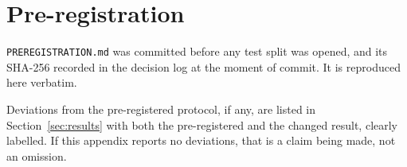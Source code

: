 \section{Pre-registration}
\label{app:prereg}

\texttt{PREREGISTRATION.md} was committed before any test split was opened, and its SHA-256 recorded
in the decision log at the moment of commit. It is reproduced here verbatim.


Deviations from the pre-registered protocol, if any, are listed in Section~\ref{sec:results} with
both the pre-registered and the changed result, clearly labelled. If this appendix reports no
deviations, that is a claim being made, not an omission.
